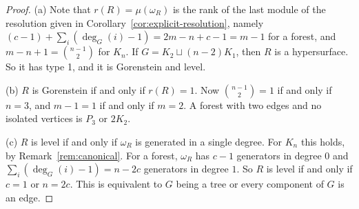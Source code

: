 \documentclass[12pt]{amsart}
\begin{document}
\begin{proof}
(a) Note that $r(R)=\mu(\omega_R)$ is the rank of the last module of the resolution  given in Corollary~\ref{cor:explicit-resolution}, namely
$(c-1)+\sum_i(\deg_G(i)-1)=2m-n+c-1=m-1$ for a forest, and $m-n+1=\binom{n-1}{2}$ for $K_n$. If $G=K_2\sqcup (n-2)K_1$, then  $R$ is a hypersurface. So it has type 1, and it is Gorenstein and level.
\smallskip

(b) $R$ is Gorenstein if and only if $r(R)=1$. Now $\binom{n-1}{2}=1$ if and only if $n=3$, and $m-1=1$ if and only if $m=2$. A forest with two edges
and no isolated vertices is $P_3$ or $2K_2$.
\smallskip

(c) $R$ is level if and only if  $\omega_R$ is generated in a single degree. For $K_n$ this holds, by Remark~\ref{rem:canonical}. For a forest, $\omega_R$ has
$c-1$ generators in degree $0$ and $\sum_i(\deg_G(i)-1)=n-2c$ generators in degree $1$. So $R$ is level if and only if $c=1$
or $n=2c$. This is equivalent to $G$ being a tree or every component of $G$ is an edge.
\smallskip


\end{proof}
\end{document}
